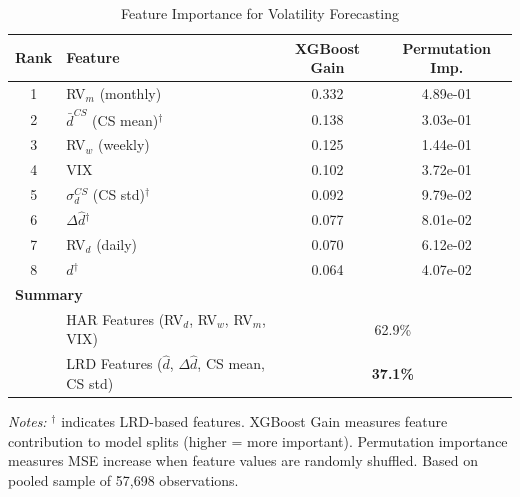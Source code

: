 \begin{table}[htbp]
\centering
\caption{Feature Importance for Volatility Forecasting}
\label{tab:feature_importance}
\small
\begin{tabular}{clcc}
\toprule
Rank & Feature & XGBoost Gain & Permutation Imp. \\
\midrule
1 & RV$_m$ (monthly) & 0.332 & 4.89e-01 \\
2 & $\bar{d}^{CS}$ (CS mean)$^\dagger$ & 0.138 & 3.03e-01 \\
3 & RV$_w$ (weekly) & 0.125 & 1.44e-01 \\
4 & VIX & 0.102 & 3.72e-01 \\
5 & $\sigma_d^{CS}$ (CS std)$^\dagger$ & 0.092 & 9.79e-02 \\
6 & $\Delta\hat{d}$$^\dagger$ & 0.077 & 8.01e-02 \\
7 & RV$_d$ (daily) & 0.070 & 6.12e-02 \\
8 & $\hat{d}$$^\dagger$ & 0.064 & 4.07e-02 \\
\midrule
\multicolumn{4}{l}{\textbf{Summary}} \\
\midrule
& HAR Features (RV$_d$, RV$_w$, RV$_m$, VIX) & \multicolumn{2}{c}{62.9\%} \\
& LRD Features ($\hat{d}$, $\Delta\hat{d}$, CS mean, CS std) & \multicolumn{2}{c}{\textbf{37.1\%}} \\
\bottomrule
\end{tabular}
\begin{tablenotes}\small
\item \textit{Notes:} $^\dagger$ indicates LRD-based features. XGBoost Gain measures feature contribution to model splits (higher = more important). Permutation importance measures MSE increase when feature values are randomly shuffled. Based on pooled sample of 57,698 observations.
\end{tablenotes}
\end{table}




